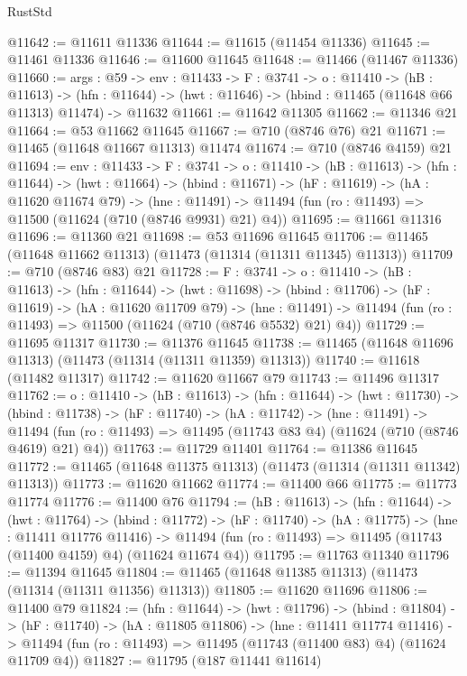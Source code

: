 \begin{lexlean}{RustStd}
\begin{coremodule}
@11642 := @11611 @11336
@11644 := @11615 (@11454 @11336)
@11645 := @11461 @11336
@11646 := @11600 @11645
@11648 := @11466 (@11467 @11336)
@11660 := {args : @59} ->
  {env : @11433} ->
  {F : @3741} ->
  {o : @11410} ->
  (hB : @11613) ->
  (hfn : @11644) -> (hwt : @11646) -> (hbind : @11465 (@11648 @66 @11313) @11474) -> @11632
@11661 := @11642 @11305
@11662 := @11346 @21
@11664 := @53 @11662 @11645
@11667 := @710 (@8746 @76) @21
@11671 := @11465 (@11648 @11667 @11313) @11474
@11674 := @710 (@8746 @4159) @21
@11694 := {env : @11433} ->
  {F : @3741} ->
  {o : @11410} ->
  (hB : @11613) ->
  (hfn : @11644) ->
  (hwt : @11664) ->
  (hbind : @11671) ->
  (hF : @11619) ->
  (hA : @11620 @11674 @79) ->
  (hne : @11491) -> @11494 (fun (ro : @11493) => @11500 (@11624 (@710 (@8746 @9931) @21) @4))
@11695 := @11661 @11316
@11696 := @11360 @21
@11698 := @53 @11696 @11645
@11706 := @11465 (@11648 @11662 @11313) (@11473 (@11314 (@11311 @11345) @11313))
@11709 := @710 (@8746 @83) @21
@11728 := {F : @3741} ->
  {o : @11410} ->
  (hB : @11613) ->
  (hfn : @11644) ->
  (hwt : @11698) ->
  (hbind : @11706) ->
  (hF : @11619) ->
  (hA : @11620 @11709 @79) ->
  (hne : @11491) -> @11494 (fun (ro : @11493) => @11500 (@11624 (@710 (@8746 @5532) @21) @4))
@11729 := @11695 @11317
@11730 := @11376 @11645
@11738 := @11465 (@11648 @11696 @11313) (@11473 (@11314 (@11311 @11359) @11313))
@11740 := @11618 (@11482 @11317)
@11742 := @11620 @11667 @79
@11743 := @11496 @11317
@11762 := {o : @11410} ->
  (hB : @11613) ->
  (hfn : @11644) ->
  (hwt : @11730) ->
  (hbind : @11738) ->
  (hF : @11740) ->
  (hA : @11742) ->
  (hne : @11491) ->
  @11494 (fun (ro : @11493) => @11495 (@11743 @83 @4) (@11624 (@710 (@8746 @4619) @21) @4))
@11763 := @11729 @11401
@11764 := @11386 @11645
@11772 := @11465 (@11648 @11375 @11313) (@11473 (@11314 (@11311 @11342) @11313))
@11773 := @11620 @11662
@11774 := @11400 @66
@11775 := @11773 @11774
@11776 := @11400 @76
@11794 := (hB : @11613) ->
  (hfn : @11644) ->
  (hwt : @11764) ->
  (hbind : @11772) ->
  (hF : @11740) ->
  (hA : @11775) ->
  (hne : @11411 @11776 @11416) ->
  @11494 (fun (ro : @11493) => @11495 (@11743 (@11400 @4159) @4) (@11624 @11674 @4))
@11795 := @11763 @11340
@11796 := @11394 @11645
@11804 := @11465 (@11648 @11385 @11313) (@11473 (@11314 (@11311 @11356) @11313))
@11805 := @11620 @11696
@11806 := @11400 @79
@11824 := (hfn : @11644) ->
  (hwt : @11796) ->
  (hbind : @11804) ->
  (hF : @11740) ->
  (hA : @11805 @11806) ->
  (hne : @11411 @11774 @11416) ->
  @11494 (fun (ro : @11493) => @11495 (@11743 (@11400 @83) @4) (@11624 @11709 @4))
@11827 := @11795 (@187 @11441 @11614)

\end{coremodule}
\end{lexlean}
